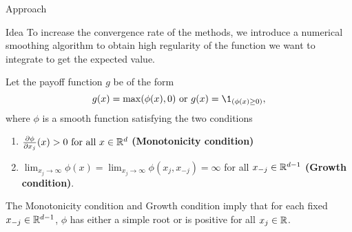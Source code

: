 \begin{frame}{Approach}
	\begin{block}{Idea}
		To increase the convergence rate of the methods, we introduce a numerical smoothing algorithm to obtain high regularity of the function we want to integrate to get the expected value. 
	\end{block}
	Let the payoff function $g$ be of the form
	\[
		g(x) = \max(\phi(x), 0) \text{ or }
		g(x) = \1_{(\phi(x) \geq 0)},
	\]
	where $\phi$ is a smooth function satisfying the two conditions
	\begin{enumerate}
		\item $\frac{\partial \phi}{\partial x_j}(x) >0 \text{ for all } x\in \mathbb{R}^d$ \textbf{(Monotonicity condition)}
		\item $\lim_{x_j \to\infty} \phi(x) = \lim_{x_j \to\infty} \phi(x_j, x_{-j}) = \infty$ for all $x_{-j} \in \mathbb{R}^{d-1}$ \textbf{(Growth condition)}.
	\end{enumerate}
\end{frame}

\begin{frame}
	The Monotonicity condition and Growth condition imply that for each fixed $x_{-j}\in \mathbb{R}^{d-1}$, $\phi$ has either a simple root or is positive for all $x_j\in \mathbb{R}$.
\end{frame}